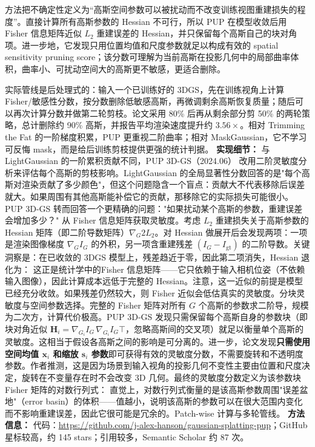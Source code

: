 方法把不确定性定义为“高斯空间参数可以被扰动而不改变训练视图重建损失的程度”。直接计算所有高斯参数的 Hessian 不可行，所以 PUP 在模型收敛后用 Fisher 信息矩阵近似 $L_2$ 重建误差的 Hessian，并只保留每个高斯自己的块对角项。进一步地，它发现只用位置均值和尺度参数就足以构成有效的 spatial sensitivity pruning score；该分数可理解为当前高斯在投影几何中的局部曲率体积，曲率小、可扰动空间大的高斯更不敏感，更适合删除。

实际管线是后处理式的：输入一个已训练好的 3DGS，先在训练视角上计算 Fisher/敏感性分数，按分数删除低敏感高斯，再微调剩余高斯恢复质量；随后可以再次计算分数并做第二轮剪枝。论文采用 80\% 后再从剩余部分剪 50\% 的两轮策略，总计删除约 90\% 高斯，并报告平均渲染速度提升约 $3.56\times$。相对 Trimming the Fat 的一阶梯度积累，PUP 更重视二阶曲率；相对 MaskGaussian，它不学习可反悔 mask，而是给后训练剪枝提供更强的统计判据。
\textbf{实现细节：} 与 LightGaussian 的一阶累积贡献不同，PUP 3D-GS（2024.06） 改用二阶灵敏度分析来评估每个高斯的剪枝影响。LightGaussian 的全局显著性分数回答的是"每个高斯对渲染贡献了多少颜色"，但这个问题隐含一个盲点：贡献大不代表移除后误差就大。如果周围有其他高斯能补偿它的贡献，那移除它的实际损失可能很小。PUP 3D-GS 转而回答一个更精确的问题："如果扰动某个高斯的参数，重建误差会增加多少？" 从 Fisher 信息矩阵获取灵敏度。考虑 $L_2$ 重建损失关于高斯参数的 Hessian 矩阵（即二阶导数矩阵）$\nabla_G^{}2 L_2$。对 Hessian 做展开后会发现两项：一项是渲染图像梯度 $\nabla_G I_G$ 的外积，另一项含重建残差 $(I_G - I_{\mathrm{gt}})$ 的二阶导数。关键洞察是：在已收敛的 3DGS 模型上，残差趋近于零，因此第二项消失，Hessian 退化为： 这正是统计学中的Fisher 信息矩阵——它只依赖于输入相机位姿（不依赖输入图像），因此计算成本远低于完整的 Hessian。注意，这一近似的前提是模型已经充分收敛。如果残差仍然较大，则 Fisher 近似会低估真实的灵敏度。分块灵敏度与空间参数选择。完整的 Fisher 矩阵对所有 $G$ 个高斯的参数求二阶导，规模为二次方，计算代价极高。PUP 3D-GS 发现只需保留每个高斯自身的参数块（即块对角近似 $\mathbf{H}_i = \nabla_{G_i} I_G\, \nabla_{G_i} I_G^{}\top$，忽略高斯间的交叉项）就足以衡量单个高斯的灵敏度。这相当于假设各高斯之间的影响是可分离的。进一步，论文发现\textbf{只需使用空间均值 $\mathbf{x}_i$ 和缩放 $\mathbf{s}_i$ 参数}即可获得有效的灵敏度分数，不需要旋转和不透明度参数。作者推测，这是因为场景到输入视角的投影几何不变性主要由位置和尺度决定，旋转在不变量存在时不会改变 3D 几何。最终的灵敏度分数定义为该参数块 Fisher 矩阵的对数行列式： 直觉上，对数行列式衡量的是该高斯参数周围"误差盆地"（error basin）的体积——值越小，说明该高斯的参数可以在很大范围内变化而不影响重建误差，因此它很可能是冗余的。Patch-wise 计算与多轮管线。
\textbf{方法信息：} 代码：\url{https://github.com/j-alex-hanson/gaussian-splatting-pup}；GitHub 星标较高，约 145 stars；引用较多，Semantic Scholar 约 87 次。
